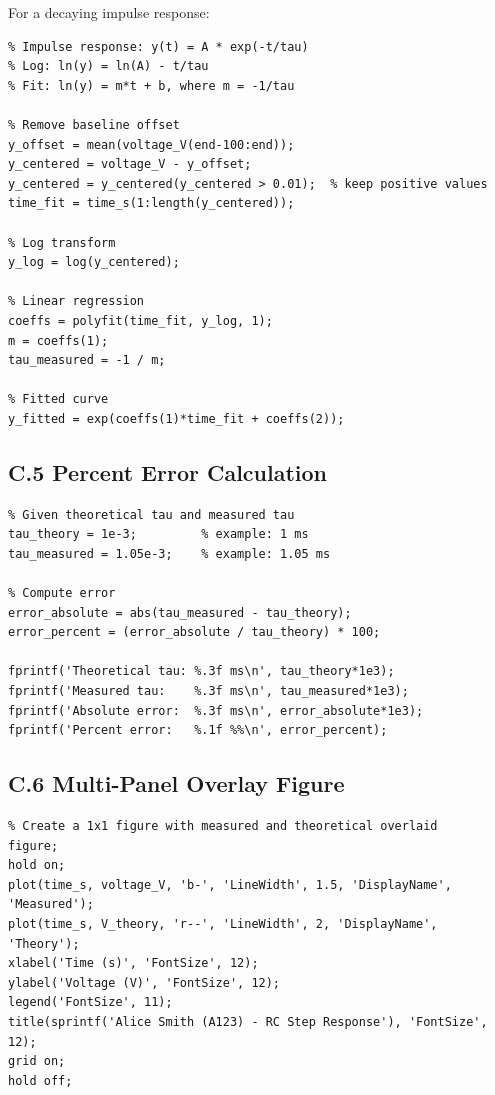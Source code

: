 \documentclass[11pt,letterpaper]{article}
\begin{document}
\noindent
For a decaying impulse response:

\begin{verbatim}
% Impulse response: y(t) = A * exp(-t/tau)
% Log: ln(y) = ln(A) - t/tau
% Fit: ln(y) = m*t + b, where m = -1/tau

% Remove baseline offset
y_offset = mean(voltage_V(end-100:end));
y_centered = voltage_V - y_offset;
y_centered = y_centered(y_centered > 0.01);  % keep positive values
time_fit = time_s(1:length(y_centered));

% Log transform
y_log = log(y_centered);

% Linear regression
coeffs = polyfit(time_fit, y_log, 1);
m = coeffs(1);
tau_measured = -1 / m;

% Fitted curve
y_fitted = exp(coeffs(1)*time_fit + coeffs(2));
\end{verbatim}

\subsection*{C.5 Percent Error Calculation}

\begin{verbatim}
% Given theoretical tau and measured tau
tau_theory = 1e-3;         % example: 1 ms
tau_measured = 1.05e-3;    % example: 1.05 ms

% Compute error
error_absolute = abs(tau_measured - tau_theory);
error_percent = (error_absolute / tau_theory) * 100;

fprintf('Theoretical tau: %.3f ms\n', tau_theory*1e3);
fprintf('Measured tau:    %.3f ms\n', tau_measured*1e3);
fprintf('Absolute error:  %.3f ms\n', error_absolute*1e3);
fprintf('Percent error:   %.1f %%\n', error_percent);
\end{verbatim}

\subsection*{C.6 Multi-Panel Overlay Figure}

\begin{verbatim}
% Create a 1x1 figure with measured and theoretical overlaid
figure;
hold on;
plot(time_s, voltage_V, 'b-', 'LineWidth', 1.5, 'DisplayName', 'Measured');
plot(time_s, V_theory, 'r--', 'LineWidth', 2, 'DisplayName', 'Theory');
xlabel('Time (s)', 'FontSize', 12);
ylabel('Voltage (V)', 'FontSize', 12);
legend('FontSize', 11);
title(sprintf('Alice Smith (A123) - RC Step Response'), 'FontSize', 12);
grid on;
hold off;
\end{verbatim}
\end{document}

